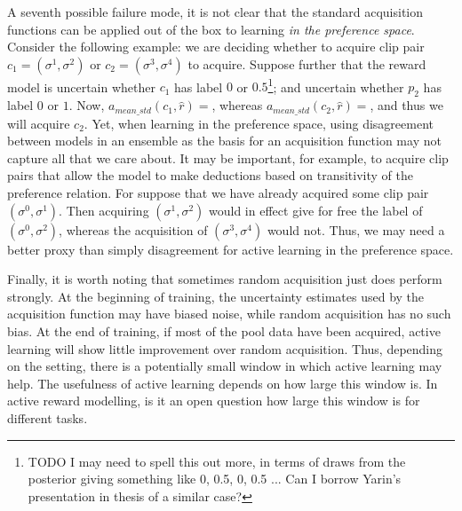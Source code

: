 \documentclass[11pt, a4paper, bibliography=totoc]{report}
\newcommand{\rp}{\hat{r}}
\begin{document}
A seventh possible failure mode, it is not clear that the standard acquisition functions can be applied out of the box to learning \textit{in the preference space}. Consider the following example: we are deciding whether to acquire clip pair $ c_1 = (\sigma^1, \sigma^2) $ or $ c_2 = (\sigma^3, \sigma^4) $ to acquire. Suppose further that the reward model is uncertain whether $ c_1 $ has label $ 0 $ or $ 0.5 $\footnote{TODO I may need to spell this out more, in terms of draws from the posterior giving something like 0, 0.5, 0, 0.5 ... Can I borrow Yarin's presentation in thesis of a similar case?}; and uncertain whether $ p_2 $ has label $ 0 $ or $ 1 $. Now, $ a_{mean\_std}(c_1, \rp) =  $, whereas $ a_{mean\_std}(c_2, \rp) =  $, and thus we will acquire $ c_2 $. Yet, when learning in the preference space, using disagreement between models in an ensemble as the basis for an acquisition function may not capture all that we care about. It may be important, for example, to acquire clip pairs that allow the model to make deductions based on transitivity of the preference relation. For suppose that we have already acquired some clip pair $ (\sigma^0, \sigma^1) $. Then acquiring $ (\sigma^1, \sigma^2) $ would in effect give for free the label of $ (\sigma^0, \sigma^2) $, whereas the acquisition of $ (\sigma^3, \sigma^4) $ would not. Thus, we may need a better proxy than simply disagreement for active learning in the preference space.

Finally, it is worth noting that sometimes random acquisition just does perform strongly. At the beginning of training, the uncertainty estimates used by the acquisition function may have biased noise, while random acquisition has no such bias. At the end of training, if most of the pool data have been acquired, active learning will show little improvement over random acquisition. Thus, depending on the setting, there is a potentially small window in which active learning may help. The usefulness of active learning depends on how large this window is. In active reward modelling, is it an open question how large this window is for different tasks.
\end{document}
